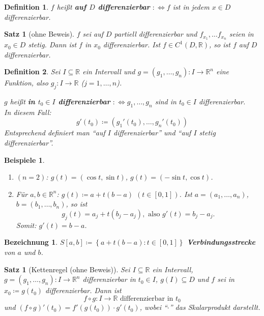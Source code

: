 \documentclass[12pt]{extreport} %
\newcommand{\R}{\mathbb{R}}
\theoremstyle{named}
\theoremstyle{nnamed}
\theoremstyle{itshape}
\newtheorem{satz}[unnamedtheorem]{Satz}
\newtheorem*{definition}{Definition}
\theoremstyle{normal}
\newtheorem*{beispiele}{Beispiele}
\newtheorem*{bezeichnung}{Bezeichnung}
\begin{document}
\begin{definition}
	$f$ hei{\ss}t \textbf{auf $D$ differenzierbar} $:\iff f$ ist in jedem $x \in D$ differenzierbar.
\end{definition}


\begin{satz}[ohne Beweis] \label{18.3:satz}
	$f$ sei auf $D$ partiell differenzierbar und $f_{x_{1}}, \dotsc f_{x_{n}}$ seien in $x_0 \in D$ stetig. Dann ist $f$ in $x_{0}$ differenzierbar. Ist $f \in C^{1}(D, \R)$, so ist $f$ auf $D$ differenzierbar.
\end{satz}

\begin{definition}
	Sei $I \subseteq \R$ ein Intervall und $g = (g_1, \dotsc, g_n) \colon I \rightarrow \R^{n}$ eine Funktion, also $g_{j} \colon I \rightarrow \R$ ($j = 1, \dotsc, n$).
	
	\bigskip
	
	$g$ hei{\ss}t \textbf{in $t_0 \in I$ differenzierbar} $: \iff g_1, \dotsc, g_n$ sind in $t_0 \in I$ differenzierbar. ~\\
	In diesem Fall:
	$$ g'(t_0) \coloneqq \left( g_1'(t_0), \dotsc, g_n'(t_0) \right) $$
	Entsprechend definiert man \enquote{auf $I$ differenzierbar} und \enquote{auf $I$ stetig differenzierbar}.
\end{definition}

\begin{beispiele} ~\
	\begin{enumerate}
		\item $(n=2)$: $g(t) = \left( \cos t, \sin t \right)$, $g(t) = \left( -\sin t, \cos t \right)$.
		\item Für $a, b \in \R^{n}$: $g(t) \coloneqq a + t \left( b - a \right)$ $\left(t \in [0, 1]\right)$. Ist $a = (a_1, \dotsc, a_n)$, $b = (b_1, \dotsc, b_n)$, so ist
				$$ g_j(t) = a_j + t (b_j - a_j), \text{ also } g'(t) = b_j - a_j. $$
			Somit: $g'(t) = b - a$.
	\end{enumerate}	
\end{beispiele}

\begin{bezeichnung}
	$S[a, b] \coloneqq \left\{ a + t (b - a) : t \in [0, 1] \right\}$ \textbf{Verbindungsstrecke} von $a$ und $b$.
\end{bezeichnung}


\begin{satz}[Kettenregel (ohne Beweis)] \label{18.4:satz}
	Sei $I \subseteq \R$ ein Intervall, $g = (g_1, \dotsc, g_n) \colon I \rightarrow \R^{n}$ differenzierbar in $t_{0} \in I$, $g(I) \subseteq D$ und $f$ sei in $x_{0} \coloneqq g(t_0)$ differenzierbar. Dann ist
	$$ f \circ g \colon I \rightarrow \R \text{ differenzierbar in } t_0 $$
	und $\left( f \circ g \right)'(t_0) = f'(g(t_{0})) \cdot g'(t_{0})$, wobei \enquote{$\cdot$} das Skalarprodukt darstellt.
\end{satz}
\end{document}
